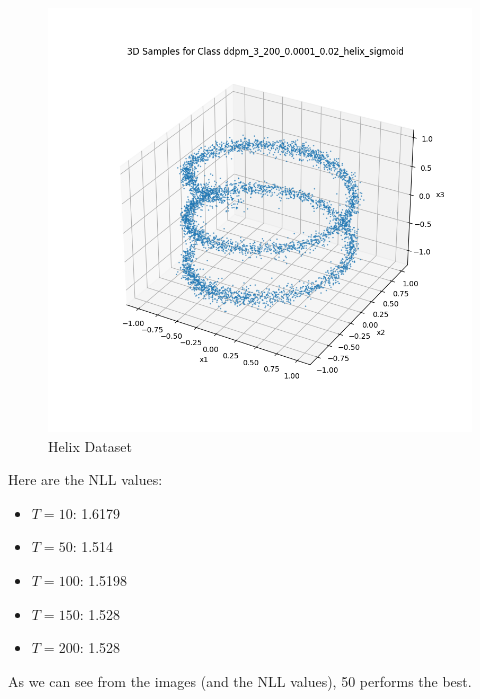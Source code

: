 \documentclass[a4paper,12pt]{article}
\begin{document}
\begin{figure}[H]
\begin{minipage}{0.3\textwidth}
  \end{minipage}
  \begin{minipage}{0.3\textwidth}
      \centering
      \includegraphics[width=\linewidth]{"images/Samples for ddpm_3_200_0.0001_0.02_helix_sigmoid.png"}
  \end{minipage}

  \caption{Helix Dataset}
\end{figure}


Here are the NLL values:
\begin{itemize}
  \item $T = 10$: 1.6179
  \item $T = 50$: 1.514
  \item $T = 100$: 1.5198
  \item $T = 150$: 1.528
  \item $T = 200$: 1.528
\end{itemize}

As we can see from the images (and the NLL values), 50 performs the best.
\end{document}
